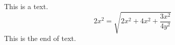 \documentclass[a4paper]{article}
\begin{document}
This is a text.
\[ 
2x^2 = \sqrt{2x^2 + 4x^2 + \frac{3x^2}{4y^2} } 
\] 
This is the end of text.
\end{document}
